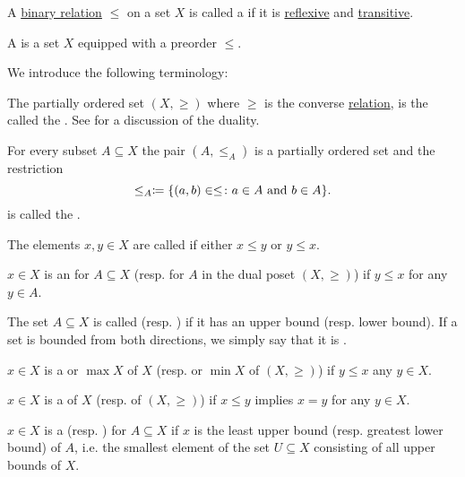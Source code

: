 \begin{definition}\label{def:preordered_set}
  A \hyperref[def:binary_relation]{binary relation} \( \leq \) on a set \( X \) is called a  if it is \hyperref[def:binary_relation/reflexive]{reflexive} and \hyperref[def:binary_relation/transitive]{transitive}.

  A  is a set \( X \) equipped with a preorder \( \leq \).

  We introduce the following terminology:
  \begin{DefEnum}
     The partially ordered set \( (X, \geq) \) where \( \geq \) is the converse \hyperref[def:binary_relation/converse]{relation}, is the called the . See  for a discussion of the duality.

     For every subset \( A \subseteq X \) the pair \( (A, \leq_A) \) is a partially ordered set and the restriction
    \begin{equation*}
      \leq_A \coloneqq \{ (a, b) \in \leq \colon a \in A \text{ and } b \in A \}.
    \end{equation*}
    is called the .

     The elements \( x, y \in X \) are called  if either \( x \leq y \) or \( y \leq x \).

    \cite[170]{Enderton1977} \( x \in X \) is an  for \( A \subseteq X \) (resp.  for \( A \) in the dual poset \( (X, \geq) \)) if \( y \leq x \) for any \( y \in A \).

     The set \( A \subseteq X \) is called  (resp. ) if it has an upper bound (resp. lower bound). If a set is bounded from both directions, we simply say that it is .

    \cite[171]{Enderton1977} \( x \in X \) is a  or  \( \max X \) of \( X \) (resp.  or  \( \min X \) of \( (X, \geq) \)) if \( y \leq x \) any \( y \in X \).

    \cite[170]{Enderton1977} \( x \in X \) is a  of \( X \) (resp.  of \( (X, \geq) \)) if \( x \leq y \) implies \( x = y \) for any \( y \in X \).

    \cite[170]{Enderton1977} \( x \in X \) is a  (resp. ) for \( A \subseteq X \) if \( x \) is the least upper bound (resp. greatest lower bound) of \( A \), i.e. the smallest element of the set \( U \subseteq X \) consisting of all upper bounds of \( X \).
  \end{DefEnum}
\end{definition}

